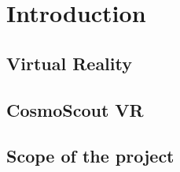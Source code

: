 \chapter{Introduction}\label{ch:introduction}

\section{Virtual Reality}\label{sec:virtual-reality}

\section{CosmoScout VR}\label{sec:cosmoscout-vr}

\section{Scope of the project}\label{sec:scope-of-the-project}
